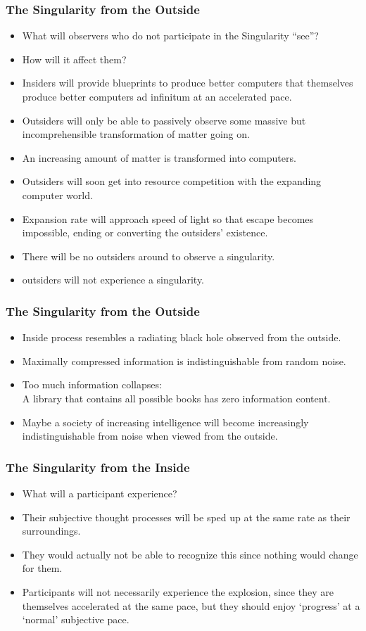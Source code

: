\documentclass[UTF8,11pt,colorlinks,compress,openany]{beamer}%
\begin{document}
\begin{frame}\frametitle{The Singularity from the Outside}
\begin{itemize}
	\item What will observers who do not participate in the Singularity ``see''?
	\item How will it affect them?
	\item Insiders will provide blueprints to produce better computers that themselves produce better computers ad infinitum at an accelerated pace.
	\item Outsiders will only be able to passively observe some massive but incomprehensible transformation of matter going on.
	\item An increasing amount of matter is transformed into computers.
	\item Outsiders will soon get into resource competition with the expanding computer world.
	\item Expansion rate will approach speed of light so that escape becomes impossible, ending or converting the outsiders' existence.
	\item There will be no outsiders around to observe a singularity.
	\item outsiders will not experience a singularity.
\end{itemize}
\end{frame}

\begin{frame}\frametitle{The Singularity from the Outside}
\begin{itemize}
	\item Inside process resembles a radiating black hole observed from the outside.
	\item Maximally compressed information is indistinguishable from random noise.
	\item Too much information collapses:\\
	A library that contains all possible books has zero information content.
	\item Maybe a society of increasing intelligence will become increasingly indistinguishable from noise when viewed from the outside.
\end{itemize}
\end{frame}

\begin{frame}\frametitle{The Singularity from the Inside}
\begin{itemize}
	\item What will a participant experience?
	\item Their subjective thought processes will be sped up at the same rate as their surroundings.
	\item They would actually not be able to recognize this since nothing would change for them.
	\item Participants will not necessarily experience the explosion, since they are themselves accelerated at the same pace, but they should enjoy `progress' at a `normal' subjective pace.
\end{itemize}
\end{frame}
\end{document}
